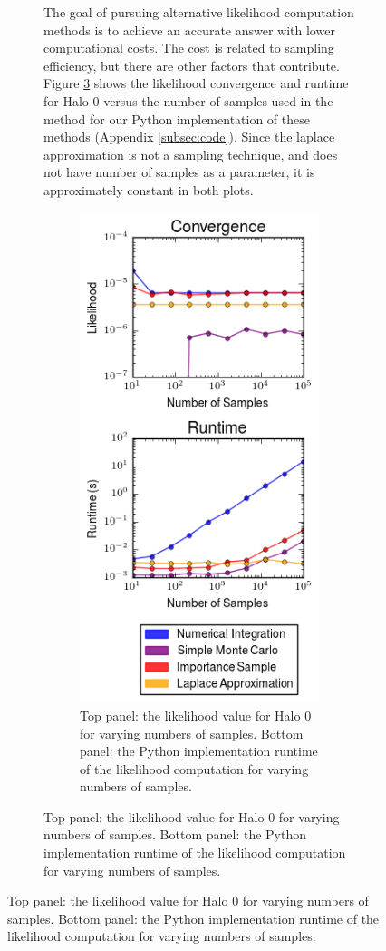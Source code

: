\documentclass[\docopts]{\docclass}
\begin{document}
\begin{figure}[h!]
\begin{figure}[h!]
The goal of pursuing alternative likelihood computation methods is to achieve an accurate answer with lower computational costs. 
The cost is related to sampling efficiency, but there are other factors that contribute.
Figure \ref{fig:convergence} shows the likelihood convergence and runtime for Halo 0 versus the number of samples used in the method for our Python implementation of these methods (Appendix \ref{subsec:code}).
Since the laplace approximation is not a sampling technique, and does not have number of samples as a parameter, it is approximately constant in both plots. 


\begin{figure}[!h]
\centering
\includegraphics[width=0.9\columnwidth]{convergence.png}
\caption{
Top panel: the likelihood value for Halo 0 for varying numbers of samples.
Bottom panel: the Python implementation runtime of the likelihood computation for varying numbers of samples.
\label{fig:convergence}}
\end{figure}


\end{figure}
\end{figure}
\end{document}
